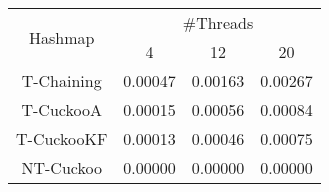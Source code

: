 \begin{tabular}{|c|c|c|c|}
\hline
\multirow{2}{*}{Hashmap} & \multicolumn{3}{c|}{\#Threads}\\\cline{2-4}& 4 & 12 & 20\\
\hline
\hline
T-Chaining & 0.00047 & 0.00163 & 0.00267\\
T-CuckooA & 0.00015 & 0.00056 & 0.00084\\
T-CuckooKF & 0.00013 & 0.00046 & 0.00075\\
NT-Cuckoo & 0.00000 & 0.00000 & 0.00000\\
\hline
\end{tabular}
